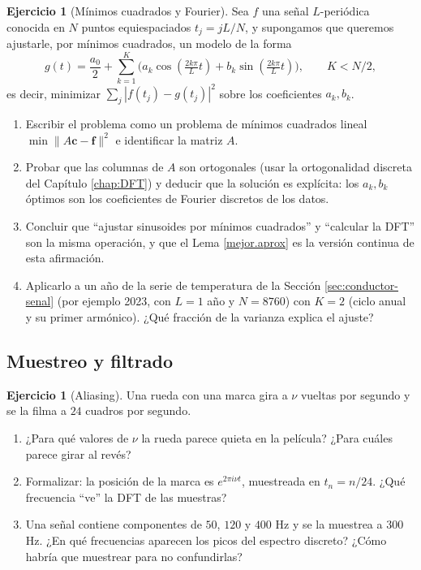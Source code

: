\documentclass[12pt, a4paper]{amsbook}
\newcommand{\cc}{{\mathbf c}}
\newcommand{\ff}{{\mathbf f}}
\theoremstyle{remark}
\theoremstyle{definition}
\newtheorem{ejer}[teo]{Ejercicio}
\numberwithin{section}{chapter}
\numberwithin{subsection}{section}
\numberwithin{equation}{section}
\numberwithin{figure}{chapter}
\begin{document}
\begin{ejer}[Mínimos cuadrados y Fourier]
Sea $f$ una señal $L$-periódica conocida en $N$ puntos equiespaciados $t_j = jL/N$, y supongamos que queremos ajustarle, por mínimos cuadrados, un modelo de la forma
$$
g(t) = \frac{a_0}{2} + \sum_{k=1}^{K} \bigl(a_k\cos(\tfrac{2k\pi}{L}t) + b_k\sin(\tfrac{2k\pi}{L}t)\bigr),\qquad K<N/2,
$$
es decir, minimizar $\sum_j |f(t_j)-g(t_j)|^2$ sobre los coeficientes $a_k,b_k$.
\begin{enumerate}
\item Escribir el problema como un problema de mínimos cuadrados lineal $\min\|A\cc - \ff\|^2$ e identificar la matriz $A$.
\item Probar que las columnas de $A$ son ortogonales (usar la ortogonalidad discreta del Capítulo \ref{chap:DFT}) y deducir que la solución es explícita: los $a_k,b_k$ óptimos son los coeficientes de Fourier discretos de los datos.
\item Concluir que ``ajustar sinusoides por mínimos cuadrados'' y ``calcular la DFT'' son la misma operación, y que el Lema \ref{mejor.aprox} es la versión continua de esta afirmación.
\item Aplicarlo a un año de la serie de temperatura de la Sección \ref{sec:conductor-senal} (por ejemplo 2023, con $L=1$ año y $N=8760$) con $K=2$ (ciclo anual y su primer armónico). ¿Qué fracción de la varianza explica el ajuste?
\end{enumerate}
\end{ejer}

\subsection*{Muestreo y filtrado}

\begin{ejer}[Aliasing]
Una rueda con una marca gira a $\nu$ vueltas por segundo y se la filma a $24$ cuadros por segundo.
\begin{enumerate}
\item ¿Para qué valores de $\nu$ la rueda parece quieta en la película? ¿Para cuáles parece girar al revés?
\item Formalizar: la posición de la marca es $e^{2\pi i\nu t}$, muestreada en $t_n = n/24$. ¿Qué frecuencia ``ve'' la DFT de las muestras?
\item Una señal contiene componentes de $50$, $120$ y $400$ Hz y se la muestrea a $300$ Hz. ¿En qué frecuencias aparecen los picos del espectro discreto? ¿Cómo habría que muestrear para no confundirlas?
\end{enumerate}
\end{ejer}
\end{document}
